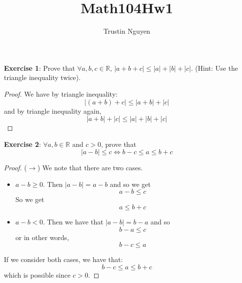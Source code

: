 \documentclass{article}
\title{Math104Hw1}
\author{Trustin Nguyen}
\begin{document}
    \maketitle

\reversemarginpar

\textbf{Exercise 1}: Prove that $\forall a, b, c \in \mathbb{R}$, $\lvert a + b + c \rvert \leq \lvert a \rvert + \lvert b \rvert + \lvert c \rvert$. (Hint: Use the triangle inequality twice).
    \begin{proof}
        We have by triangle inequality:
            \begin{equation*}
                \lvert (a + b) + c \rvert \leq \lvert a + b \rvert + \lvert c \rvert
            \end{equation*}
        and by triangle inequality again,
            \begin{equation*}
                \lvert a + b \rvert + \lvert c \rvert \leq \lvert a \rvert + \lvert b \rvert + \lvert c \rvert
            \end{equation*}
    \end{proof}

\textbf{Exercise 2}: $\forall a, b \in \mathbb{R}$ and $c > 0$, prove that
    \begin{equation*}
        \lvert a - b \rvert \leq c \iff b - c \leq a \leq b + c
    \end{equation*}
    \begin{proof}
        ($\rightarrow $) We note that there are two cases. 
            \begin{itemize}
                \item $a - b \geq 0$. Then $\lvert a - b \rvert = a - b$ and so we get
                    \begin{equation*}
                        a - b \leq c
                    \end{equation*}
                So we get
                    \begin{equation*}
                        a \leq b + c
                    \end{equation*}

                \item $a - b < 0$. Then we have that $\lvert a - b \rvert = b - a$ and so
                    \begin{equation*}
                        b - a \leq c
                    \end{equation*}
                or in other words,
                    \begin{equation*}
                        b - c \leq a
                    \end{equation*}
            \end{itemize}
        If we consider both cases, we have that:
            \begin{equation*}
                b - c \leq a \leq b + c
            \end{equation*}
        which is possible since $c > 0$.
    \end{proof}
\end{document}
